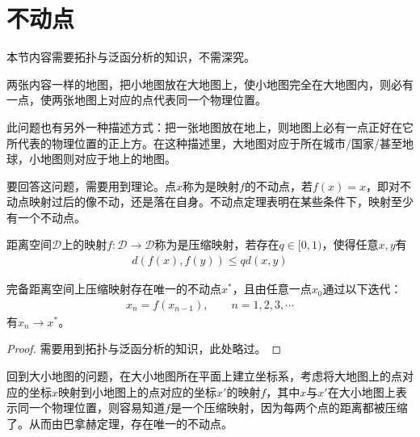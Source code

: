 
\chapter{不动点}
\label{chap:fixed-point}

本节内容需要拓扑与泛函分析的知识，不需深究。

\begin{example}
  两张内容一样的地图，把小地图放在大地图上，使小地图完全在大地图内，则必有一点，使两张地图上对应的点代表同一个物理位置。
\end{example}

此问题也有另外一种描述方式：把一张地图放在地上，则地图上必有一点正好在它所代表的物理位置的正上方。在这种描述里，大地图对应于所在城市/国家/甚至地球，小地图则对应于地上的地图。

要回答这问题，需要用到理论。点$x$称为是映射$f$的不动点，若$f(x)=x$，即对不动点映射过后的像不动，还是落在自身。不动点定理表明在某些条件下，映射至少有一个不动点。

\begin{definition}[压缩映射]
  距离空间$\mathcal{D}$上的映射$f:\mathcal{D}\to\mathcal{D}$称为是压缩映射，若存在$q\in[0,1)$，使得任意$x,y$有
  \begin{align}
    d(f(x),f(y))\le q d(x,y)
  \end{align}
\end{definition}

\begin{theorem}
  完备距离空间上压缩映射存在唯一的不动点$x^*$，且由任意一点$x_0$通过以下迭代：
  \begin{align*}
    x_{n}=f(x_{n-1}),\quad\quad n=1,2,3,\cdots
  \end{align*}
  有$x_n\to x^*$。
\end{theorem}
\begin{proof}
  需要用到拓扑与泛函分析的知识，此处略过。
\end{proof}

回到大小地图的问题，在大小地图所在平面上建立坐标系，考虑将大地图上的点对应的坐标$x$映射到小地图上的点对应的坐标$x'$的映射$f$，其中$x$与$x'$在大小地图上表示同一个物理位置，则容易知道$f$是一个压缩映射，因为每两个点的距离都被压缩了。从而由巴拿赫定理，存在唯一的不动点。
